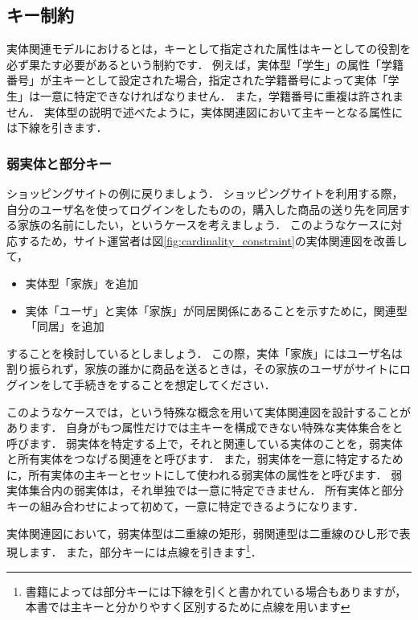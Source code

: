 \subsection{キー制約}
実体関連モデルにおけるとは，キーとして指定された属性はキーとしての役割を必ず果たす必要があるという制約です．
例えば，実体型「学生」の属性「学籍番号」が主キーとして設定された場合，指定された学籍番号によって実体「学生」は一意に特定できなければなりません．
また，学籍番号に重複は許されません．
実体型の説明で述べたように，実体関連図において主キーとなる属性には下線を引きます．

\subsubsection{弱実体と部分キー}
ショッピングサイトの例に戻りましょう．
ショッピングサイトを利用する際，自分のユーザ名を使ってログインをしたものの，購入した商品の送り先を同居する家族の名前にしたい，というケースを考えましょう．
このようなケースに対応するため，サイト運営者は図\ref{fig:cardinality_constraint}の実体関連図を改善して，
\begin{itemize}
\item 実体型「家族」を追加
\item 実体「ユーザ」と実体「家族」が同居関係にあることを示すために，関連型「同居」を追加
\end{itemize}
することを検討しているとしましょう．
この際，実体「家族」にはユーザ名は割り振られず，家族の誰かに商品を送るときは，その家族のユーザがサイトにログインをして手続きをすることを想定してください．

このようなケースでは，という特殊な概念を用いて実体関連図を設計することがあります．
自身がもつ属性だけでは主キーを構成できない特殊な実体集合をと呼びます．
弱実体を特定する上で，それと関連している実体のことを，弱実体と所有実体をつなげる関連をと呼びます．
また，弱実体を一意に特定するために，所有実体の主キーとセットにして使われる弱実体の属性をと呼びます．
弱実体集合内の弱実体は，それ単独では一意に特定できません．
所有実体と部分キーの組み合わせによって初めて，一意に特定できるようになります．

実体関連図において，弱実体型は二重線の矩形，弱関連型は二重線のひし形で表現します．
また，部分キーには点線を引きます\footnote{書籍によっては部分キーには下線を引くと書かれている場合もありますが，本書では主キーと分かりやすく区別するために点線を用います}．

